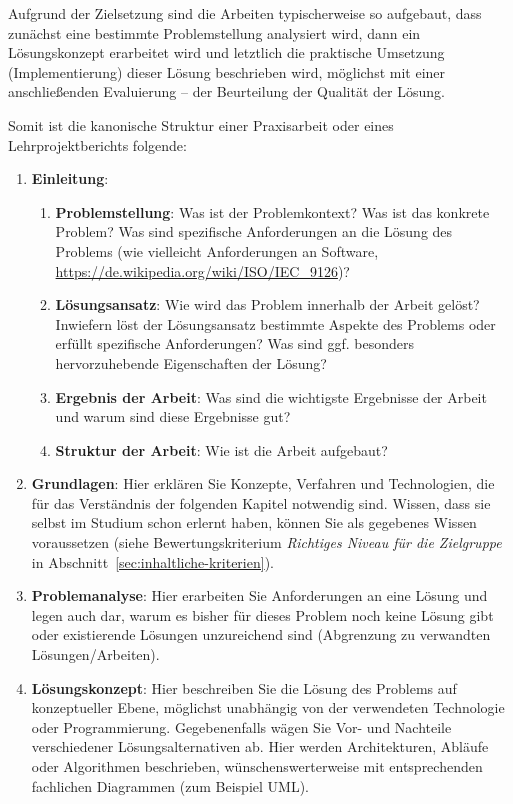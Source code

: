 Aufgrund der Zielsetzung sind die Arbeiten typischerweise so aufgebaut, dass zunächst eine bestimmte Problemstellung analysiert wird, dann ein Lösungskonzept erarbeitet wird und letztlich die praktische Umsetzung (Implementierung) dieser Lösung beschrieben wird, möglichst mit einer anschließenden Evaluierung -- der Beurteilung der Qualität der Lösung.

Somit ist die kanonische Struktur einer Praxisarbeit oder eines Lehrprojektberichts folgende:

\begin{enumerate}
    \item \textbf{Einleitung}: 
    
    \begin{enumerate}
        \item \textbf{Problemstellung}:  Was ist der Problemkontext? Was ist das konkrete Problem? Was sind spezifische Anforderungen an die Lösung des Problems (wie vielleicht Anforderungen an Software, \url{https://de.wikipedia.org/wiki/ISO/IEC_9126})?
        \item \textbf{Lösungsansatz}: Wie wird das Problem innerhalb der Arbeit gelöst? Inwiefern löst der Lösungsansatz bestimmte Aspekte des Problems oder erfüllt spezifische Anforderungen? Was sind ggf. besonders hervorzuhebende Eigenschaften der Lösung?
        \item \textbf{Ergebnis der Arbeit}: Was sind die wichtigste Ergebnisse der Arbeit und warum sind diese Ergebnisse gut?
        \item \textbf{Struktur der Arbeit}: Wie ist die Arbeit aufgebaut?
    \end{enumerate}
    \item \label{struktur:grundlagen} \textbf{Grundlagen}: Hier erklären Sie Konzepte, Verfahren und Technologien, die für das Verständnis der folgenden Kapitel notwendig sind. Wissen, dass sie selbst im Studium schon erlernt haben, können Sie als gegebenes Wissen voraussetzen (siehe Bewertungskriterium \textit{Richtiges Niveau für die Zielgruppe} in Abschnitt~\ref{sec:inhaltliche-kriterien}).
    \item \label{struktur:problemanalyse} \textbf{Problemanalyse}: Hier erarbeiten Sie Anforderungen an eine Lösung und legen auch dar, warum es bisher für dieses Problem noch keine Lösung gibt oder existierende Lösungen unzureichend sind (Abgrenzung zu verwandten Lösungen/Arbeiten).
    \item \label{struktur:loesungskonzept} \textbf{Lösungskonzept}: Hier beschreiben Sie die Lösung des Problems auf konzeptueller Ebene, möglichst unabhängig von der verwendeten Technologie oder Programmierung. Gegebenenfalls wägen Sie Vor- und Nachteile verschiedener Lösungsalternativen ab. Hier werden Architekturen, Abläufe oder Algorithmen beschrieben, wünschenswerterweise mit entsprechenden fachlichen Diagrammen (zum Beispiel UML).

\end{enumerate}
